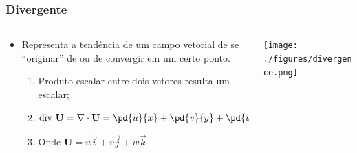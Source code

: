 \begin{frame}
\frametitle{Divergente}

  \begin{columns}
    \begin{column}{0.5\textwidth}
        \begin{itemize}[<+-| alert@+>]
          \item Representa a tendência de um campo vetorial de se ``originar''
                de ou de convergir em um certo ponto.
            \begin{enumerate}[<+-| alert@+>]
              \item Produto escalar entre dois vetores resulta um escalar;
              \item $\text{div }\mathbf{U} =
                    \nabla \cdot \mathbf{U} =
                    \pd{u}{x} + \pd{v}{y} + \pd{w}{z}$
              \item Onde $\mathbf{U} = u\vec{i}  +  v\vec{j} + w\vec{k}$
            \end{enumerate}
        \end{itemize}
    \end{column}
    \pause
    \begin{column}{0.5\textwidth}
      \begin{center}
        \texttt{[image: ./figures/divergence.png]}
      \end{center}
    \end{column}
  \end{columns}

\end{frame}


